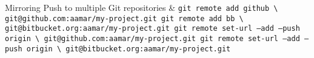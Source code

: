 \documentclass[10pt,english,landscape]{article}
\makeatletter
\renewcommand{\section}{\@startsection{section}{1}{0mm}%
{-1ex plus -.5ex minus -.2ex}%
{0.5ex plus .2ex}%
{\normalfont\large\bfseries}}
\makeatother
\begin{document}
\begin{multicols}{2}
    \begin{keys}{Mirroring}
      Push to multiple Git repositories &
      \texttt{git remote add github \textbackslash \newline
      \hspace*{0.5cm} git@github.com:aamar/my-project.git \newline
      git remote add bb \textbackslash \newline
      \hspace*{0.5cm} git@bitbucket.org:aamar/my-project.git \newline
      git remote set-url ---add ---push origin \textbackslash \newline
      \hspace*{0.5cm} git@github.com:aamar/my-project.git \newline
      git remote set-url ---add ---push origin \textbackslash \newline
      \hspace*{0.5cm} git@bitbucket.org:aamar/my-project.git
      } \\
    \end{keys}
%
%
%
%

\end{multicols}
\end{document}
